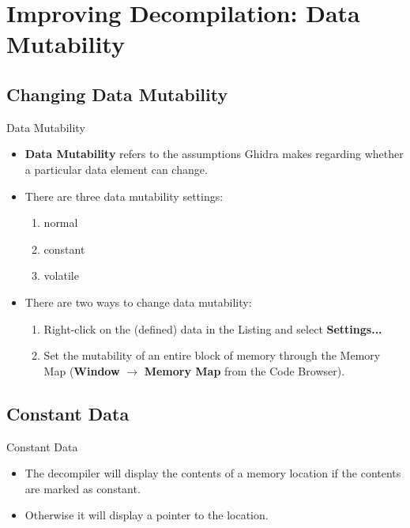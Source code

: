 \documentclass{beamer}
\begin{document}
\section{Improving Decompilation: Data Mutability}

\subsection{Changing Data Mutability}

\begin{frame}
\begin{block}{Data Mutability}
\begin{itemize}
\item \textbf{Data Mutability} refers to the assumptions Ghidra makes regarding whether a particular data element can change.
\item There are three data mutability settings:
\begin{enumerate}
\item normal
\item constant
\item volatile
\end{enumerate}
\item There are two ways to change data mutability:
\begin{enumerate}
\item Right-click on the (defined) data in the Listing and select \textbf{Settings...} 
\item Set the mutability of an entire block of memory through the Memory Map (\textbf{Window} $\rightarrow$ \textbf{Memory Map} from the Code Browser).
\end{enumerate}
\end{itemize}
\end{block}
\end{frame}

\subsection{Constant Data}

\begin{frame}
\begin{block}{Constant Data}
\begin{itemize}
\item The decompiler will display the contents of a memory location if the contents are marked as constant.
\item Otherwise it will display a pointer to the location.
\end{itemize}
\end{block}
\end{frame}
\end{document}
